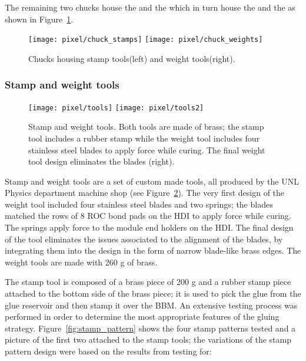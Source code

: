 The remaining two chucks house the  and the  which in turn house the  and the  as shown in Figure~\ref{fig:st_wt_plates}. 

\begin{figure}[!h]
  \centering
  \texttt{[image: pixel/chuck\_stamps]}
  \texttt{[image: pixel/chuck\_weights]}
  \caption[Stamp and Weight tools in chucks]{Chucks housing stamp tools(left) and weight tools(right).}\label{fig:st_wt_plates}
\end{figure}

\subsubsection*{Stamp and weight tools}

\begin{figure}[!h]
  \centering
  \texttt{[image: pixel/tools]}
  \texttt{[image: pixel/tools2]}
  \caption[Stamp and Weight tools]{Stamp and weight tools. Both tools are made of brass; the stamp tool includes a rubber stamp while the weight tool includes four stainless steel blades to apply force while curing. The final weight tool design eliminates the blades (right).}\label{fig:st_wt}
\end{figure}

Stamp and weight tools are a set of custom made tools, all produced by the UNL Physics department machine shop (see Figure~\ref{fig:st_wt}). The very first design of the weight tool included four stainless steel blades and two springs; the blades matched the rows of 8 ROC bond pads on the HDI to apply force while curing. The springs apply force to the module end holders on the HDI. The final design of the tool eliminates the issues associated to the alignment of the blades, by integrating them into the design in the form of narrow blade-like brass edges. The weight tools are made with 260 g of brass.      

The stamp tool is composed of a brass piece of 200 g and a rubber stamp piece attached to the bottom side of the brass piece; it is used to pick the glue from the glue reservoir and then stamp it over the BBM. An extensive testing process was performed in order to determine the most appropriate features of the gluing strategy. Figure~\ref{fig:stamp_pattern} shows the four stamp patterns tested and a picture of the first two attached to the stamp tools; the variations of the stamp pattern design were based on the results from testing for:


